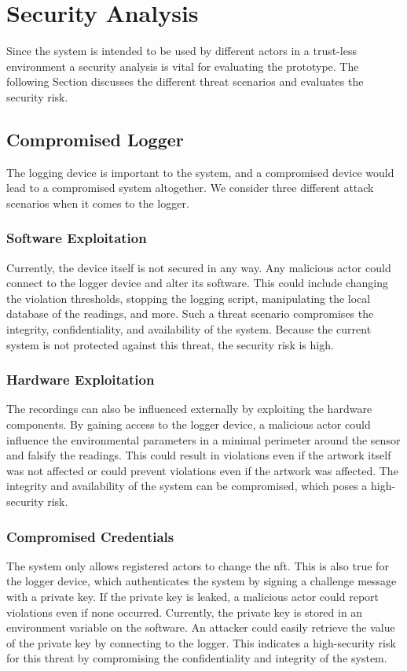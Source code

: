 \section{Security Analysis}
\label{sec:security_analysis}
Since the system is intended to be used by different actors in a trust-less environment a security analysis is vital for evaluating the prototype. The following Section discusses the different threat scenarios and evaluates the security risk.

\subsection{Compromised Logger}
The logging device is important to the system, and a compromised device would lead to a compromised system altogether. We consider three different attack scenarios when it comes to the logger.
\subsubsection{Software Exploitation}
Currently, the device itself is not secured in any way. Any malicious actor could connect to the logger device and alter its software. This could include changing the violation thresholds, stopping the logging script, manipulating the local database of the readings, and more. Such a threat scenario compromises the integrity, confidentiality, and availability of the system. Because the current system is not protected against this threat, the security risk is high.
\subsubsection{Hardware Exploitation}
The recordings can also be influenced externally by exploiting the hardware components. By gaining access to the logger device, a malicious actor could influence the environmental parameters in a minimal perimeter around the sensor and falsify the readings. This could result in violations even if the artwork itself was not affected or could prevent violations even if the artwork was affected. The integrity and availability of the system can be compromised, which poses a high-security risk.
\subsubsection{Compromised Credentials}
The system only allows registered actors to change the \gls{nft}. This is also true for the logger device, which authenticates the system by signing a challenge message with a private key. If the private key is leaked, a malicious actor could report violations even if none occurred. Currently, the private key is stored in an environment variable on the software. An attacker could easily retrieve the value of the private key by connecting to the logger. This indicates a high-security risk for this threat by compromising the confidentiality and integrity of the system.

